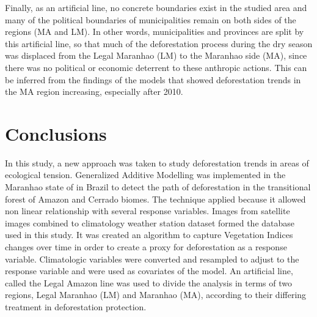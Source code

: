 Finally, as an artificial line, no concrete boundaries exist in the studied area and many of the political boundaries of municipalities remain on both sides of the regions (MA and LM). In other words, municipalities and provinces are split by this artificial line, so that much of the deforestation process during the dry season was displaced from the Legal Maranhao (LM) to the Maranhao side (MA), since there was no political or economic deterrent to these anthropic actions. This can be inferred from the findings of the models that showed deforestation trends in the MA region increasing, especially after 2010. 




\section{Conclusions}

In this study, a new approach was taken to study deforestation trends in areas of ecological tension. Generalized Additive Modelling was implemented in the Maranhao state of in Brazil to detect the path of deforestation in the transitional forest of Amazon and Cerrado biomes. The technique applied because it allowed non linear relationship with several response variables. Images from satellite images combined to climatology weather station dataset formed the database used in this study. It was created an algorithm to capture Vegetation Indices changes over time in order to create a proxy for deforestation as a response variable. Climatologic variables were converted and resampled to adjust to the response variable and were used as covariates of the model. An artificial line, called the Legal Amazon line was used to divide the analysis in terms of two regions, Legal Maranhao (LM) and Maranhao (MA), according to their differing treatment in deforestation protection.  

